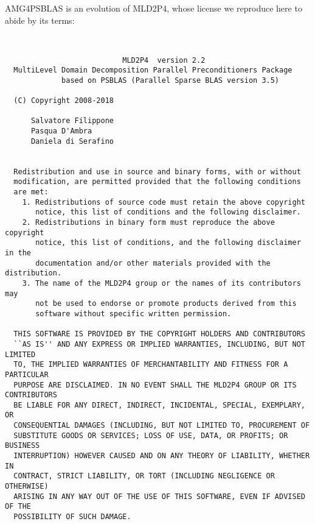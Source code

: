 \newpage
 AMG4PSBLAS is an evolution of MLD2P4, whose license we reproduce here
 to abide by its terms: {\small
\begin{verbatim}

 
                           MLD2P4  version 2.2
  MultiLevel Domain Decomposition Parallel Preconditioners Package
             based on PSBLAS (Parallel Sparse BLAS version 3.5)
  
  (C) Copyright 2008-2018

      Salvatore Filippone  
      Pasqua D'Ambra   
      Daniela di Serafino   

 
  Redistribution and use in source and binary forms, with or without
  modification, are permitted provided that the following conditions
  are met:
    1. Redistributions of source code must retain the above copyright
       notice, this list of conditions and the following disclaimer.
    2. Redistributions in binary form must reproduce the above copyright
       notice, this list of conditions, and the following disclaimer in the
       documentation and/or other materials provided with the distribution.
    3. The name of the MLD2P4 group or the names of its contributors may
       not be used to endorse or promote products derived from this
       software without specific written permission.
 
  THIS SOFTWARE IS PROVIDED BY THE COPYRIGHT HOLDERS AND CONTRIBUTORS
  ``AS IS'' AND ANY EXPRESS OR IMPLIED WARRANTIES, INCLUDING, BUT NOT LIMITED
  TO, THE IMPLIED WARRANTIES OF MERCHANTABILITY AND FITNESS FOR A PARTICULAR
  PURPOSE ARE DISCLAIMED. IN NO EVENT SHALL THE MLD2P4 GROUP OR ITS CONTRIBUTORS
  BE LIABLE FOR ANY DIRECT, INDIRECT, INCIDENTAL, SPECIAL, EXEMPLARY, OR
  CONSEQUENTIAL DAMAGES (INCLUDING, BUT NOT LIMITED TO, PROCUREMENT OF
  SUBSTITUTE GOODS OR SERVICES; LOSS OF USE, DATA, OR PROFITS; OR BUSINESS
  INTERRUPTION) HOWEVER CAUSED AND ON ANY THEORY OF LIABILITY, WHETHER IN
  CONTRACT, STRICT LIABILITY, OR TORT (INCLUDING NEGLIGENCE OR OTHERWISE)
  ARISING IN ANY WAY OUT OF THE USE OF THIS SOFTWARE, EVEN IF ADVISED OF THE
  POSSIBILITY OF SUCH DAMAGE.
 
\end{verbatim}
   }